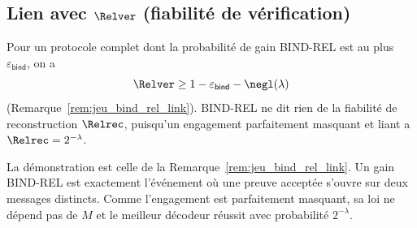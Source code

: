 \begin{sloppypar}
\subsection{Lien avec $\Relver$ (fiabilit\'e de v\'erification)}

\begin{remark}
\label{rem:ann_bind_rel_link}
Pour un protocole complet dont la probabilit\'e de gain BIND-REL est au plus
$\varepsilon_{\mathsf{bind}}$, on a
\begin{equation}
\Relver \geq 1 - \varepsilon_{\mathsf{bind}} - \negl(\lambda)
\end{equation}
(Remarque~\ref{rem:jeu_bind_rel_link}). BIND-REL ne dit rien de la fiabilit\'e de
reconstruction $\Relrec$, puisqu'un engagement parfaitement masquant et liant a
$\Relrec = 2^{-\lambda}$.
\end{remark}

\begin{Preuve}
La d\'emonstration est celle de la Remarque~\ref{rem:jeu_bind_rel_link}. Un gain
BIND-REL est exactement l'\'ev\'enement o\`u une preuve accept\'ee s'ouvre sur deux
messages distincts. Comme l'engagement est parfaitement masquant, sa loi ne d\'epend
pas de $M$ et le meilleur d\'ecodeur r\'eussit avec probabilit\'e $2^{-\lambda}$.
\end{Preuve}
\end{sloppypar}

